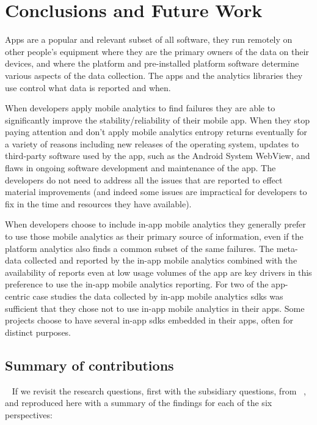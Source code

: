 \setchapterpreamble[u]{\margintoc}
\chapter{Conclusions and Future Work}\label{chapter-conclusions-and-future-work}

Apps are a popular and relevant subset of all software, they run remotely on other people’s equipment where they are the primary owners of the data on their devices, and where the platform and pre-installed platform software determine various aspects of the data collection. The apps and the analytics libraries they use control what data is reported and when. 

When developers apply mobile analytics to find failures they are able to significantly improve the stability/reliability of their mobile app. When they stop paying attention and don't apply mobile analytics entropy returns eventually for a variety of reasons including new releases of the operating system, updates to third-party software used by the app, such as the Android System WebView, and flaws in ongoing software development and maintenance of the app. The developers do not need to address all the issues that are reported to effect material improvements (and indeed some issues are impractical for developers to fix in the time and resources they have available).

When developers choose to include in-app mobile analytics they generally prefer to use those mobile analytics as their primary source of information, even if the platform analytics also finds a common subset of the same failures. The meta-data collected and reported by the in-app mobile analytics combined with the availability of reports even at low usage volumes of the app are key drivers in this preference to use the in-app mobile analytics reporting. For two of the app-centric case studies the data collected by in-app mobile analytics \Glspl{sdk} was sufficient that they chose not to use in-app mobile analytics in their apps. Some projects choose to have several in-app \Glspl{sdk} embedded in their apps, often for distinct purposes.


\section{Summary of contributions}~\label{conclusions-summary-of-contributions}
If we revisit the research questions, first with the subsidiary questions, from ~, and reproduced here with a summary of the findings for each of the six perspectives: 

